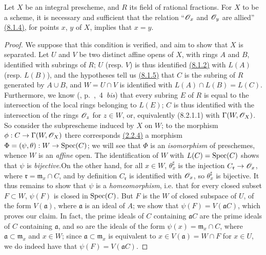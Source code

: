 \begin{prop}[8.2.2]
\label{prop-1.8.2.2}
Let $X$ be an integral prescheme,
and $R$ its field of rational fractions. For $X$ to be a scheme, it is
necessary and sufficient that the relation ``$\mathscr{O}_x$ and $\mathscr{O}_y$ are allied''
\hyperref[lem-1.8.1.4]{(8.1.4)}, for points $x$, $y$ of $X$, implies that $x=y$.
\end{prop}

\begin{proof}
\label{proof-prop-1.8.2.2}
We suppose that this condition is verified, and aim to show that $X$ is separated.
Let $U$ and $V$ be two distinct affine opens of $X$, with rings $A$ and $B$,
identified with subrings of $R$; $U$ (resp. $V$) is thus identified \hyperref[env-1.8.1.2]{(8.1.2)}
with $L(A)$ (resp. $L(B)$), and the hypotheses tell us \hyperref[env-1.8.1.5]{(8.1.5)} that $C$ is
the subring of $R$ generated by $A\cup B$, and $W=U\cap V$ is identified with
$L(A)\cap L(B)=L(C)$. Furthermore, we know
(\cite{I-1}, p.~,~4~{\it bis}) that every subring $E$ of $R$ is
equal to the intersection of the local rings belonging to $L(E)$; $C$ is thus
identified with the intersection of the rings $\mathscr{O}_z$ for $z\in W$, or,
equivalently (8.2.1.1) with $\Gamma(W,\mathscr{O}_X)$. So consider the subprescheme
induced by $X$ on $W$; to the  morphism $\phi:
C\to\Gamma(W,\mathscr{O}_X)$ there corresponds \hyperref[prop-1.2.2.4]{(2.2.4)} a morphism
$\Phi=(\psi,\theta):W\to{\mathop{\mathrm{Spec}}\nolimits}(C)$; we will see that $\Phi$ is an
{\it isomorphism} of preschemes, whence $W$ is an {\it affine} open. The
identification of $W$ with $L(C)={\mathop{\mathrm{Spec}}\nolimits}(C)$ shows that $\psi$ is
{\it bijective}.On the other hand, for all $x\in W$, $\theta_x^\sharp$ is the
injection $C_\mathfrak{r}\to\mathscr{O}_x$, where $\mathfrak{r}=\mathfrak{m}_x\cap C$,
and by definition $C_\mathfrak{r}$ is identified with $\mathscr{O}_x$, so $\theta_x^\sharp$
is bijective. It thus remains to show that $\psi$ is a {\it homeomorphism},
i.e. that for every closed subset $F\subset W$, $\psi(F)$ is closed in
${\mathop{\mathrm{Spec}}\nolimits}(C)$. But $F$ is the  $W$ of closed subspace of $U$,
of the form $V(\mathfrak{a})$, where $\mathfrak{a}$ is an ideal of $A$; we show
that $\psi(F)=V(\mathfrak{a}C)$, which proves our claim. In fact, the prime
ideals of $C$ containing $\mathfrak{a}C$ are the prime ideals of $C$ containing
$\mathfrak{a}$, and so are the ideals of the form $\psi(x)=\mathfrak{m}_x\cap
C$, where $\mathfrak{a}\subset\mathfrak{m}_x$ and $x\in W$; since
$\mathfrak{a}\subset\mathfrak{m}_x$ is equivalent to $x\in V(\mathfrak{a})=W\cap
F$ for $x\in U$, we do indeed have that $\psi(F)=V(\mathfrak{a}C)$.


\end{proof}
